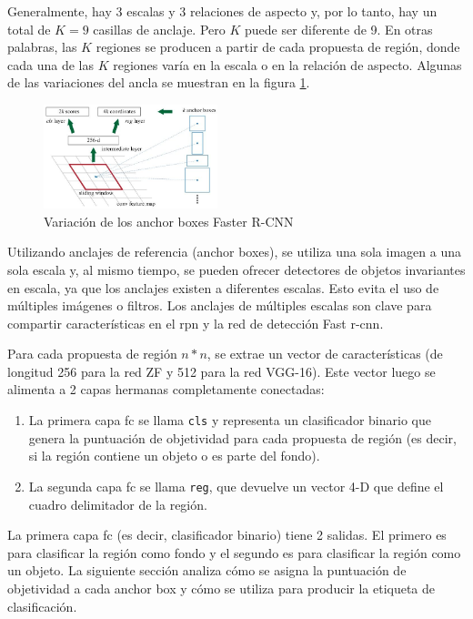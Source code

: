 Generalmente, hay 3 escalas y 3 relaciones de aspecto y, por lo tanto, hay un total de $K = 9$ casillas de anclaje. Pero $K$ puede ser diferente de 9. En otras palabras, las $K$ regiones se producen a partir de cada propuesta de región, donde cada una de las $K$ regiones varía en la escala o en la relación de aspecto. Algunas de las variaciones del ancla se muestran en la figura \ref{fig:variacion-anchor-boxes-faster-rcnn}.

\begin{figure}[ht]
\centering
\includegraphics[width=0.45\textwidth]{img/chapters/estado-del-arte/variacion-anchor-boxes-faster-rcnn.jpg}
\caption{\label{fig:variacion-anchor-boxes-faster-rcnn}Variación de los anchor boxes Faster R-CNN \cite{ren2016faster}}
\end{figure}

Utilizando anclajes de referencia (anchor boxes), se utiliza una sola imagen a una sola escala y, al mismo tiempo, se pueden ofrecer detectores de objetos invariantes en escala, ya que los anclajes existen a diferentes escalas. Esto evita el uso de múltiples imágenes o filtros. Los anclajes de múltiples escalas son clave para compartir características en el \gls{rpn} y la red de detección Fast \gls{r-cnn}.

Para cada propuesta de región $n*n$, se extrae un vector de características (de longitud 256 para la red ZF y 512 para la red VGG-16). Este vector luego se alimenta a 2 capas hermanas completamente conectadas:

\begin{enumerate}
    \item La primera capa \gls{fc} se llama \texttt{cls} y representa un clasificador binario que genera la puntuación de objetividad para cada propuesta de región (es decir, si la región contiene un objeto o es parte del fondo).
    \item La segunda capa \gls{fc} se llama \texttt{reg}, que devuelve un vector 4-D que define el cuadro delimitador de la región.
\end{enumerate}

La primera capa \gls{fc} (es decir, clasificador binario) tiene 2 salidas. El primero es para clasificar la región como fondo y el segundo es para clasificar la región como un objeto. La siguiente sección analiza cómo se asigna la puntuación de objetividad a cada anchor box y cómo se utiliza para producir la etiqueta de clasificación.

